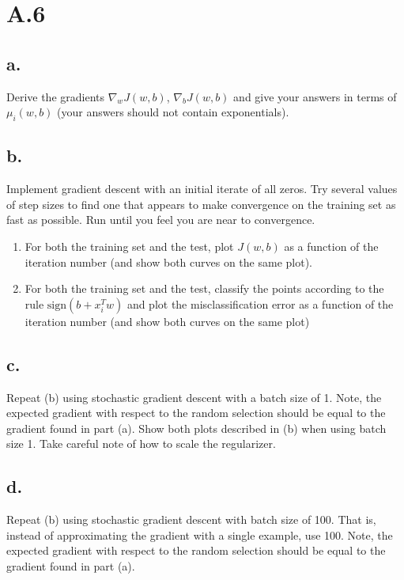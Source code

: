 \documentclass{article}
\newcommand{\1}{\mathbf{1}}
\begin{document}
\section*{A.6}
{\Large 


\subsection*{a.}

Derive the gradients $\nabla_w J(w,b)$, $\nabla_{b} J(w,b)$ and give your answers in terms of $\mu_i(w,b)$ (your answers should not contain exponentials).

\subsection*{b.}

Implement gradient descent with an initial iterate of all zeros. Try several values of step sizes to find one that appears to make convergence on the training set as fast as possible. Run until you feel you are near to convergence.

\begin{enumerate}
  \item For both the training set and the test, plot $J(w,b)$ as a function of the iteration number (and show both curves on the same plot).
  \item For both the training set and the test, classify the points according to the rule $\text{sign}(b + x_i^T w)$ and plot the misclassification error as a function of the iteration number (and show both curves on the same plot)
\end{enumerate}

\subsection*{c.}

Repeat (b) using stochastic gradient descent with a batch size of 1. Note, the expected gradient with respect to the random selection should be equal to the gradient found in part (a). Show both plots described in (b) when using batch size 1. Take careful note of how to scale the regularizer.

\subsection*{d.}

Repeat (b) using stochastic gradient descent with batch size of 100. That is, instead of approximating the gradient with a single example, use 100. Note, the expected gradient with respect to the random selection should be equal to the gradient found in part (a).

}
\end{document}

